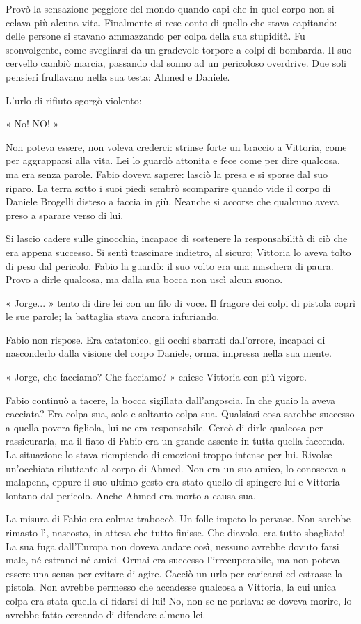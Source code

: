 Provò la sensazione peggiore del mondo quando capi che in quel corpo non si celava più alcuna vita. Finalmente si rese conto di quello che stava capitando: delle persone si stavano ammazzando per colpa della sua stupidità. Fu sconvolgente, come svegliarsi da un gradevole torpore a colpi di bombarda. Il suo cervello cambiò marcia, passando dal sonno ad un pericoloso overdrive. Due soli pensieri frullavano nella sua testa: Ahmed e Daniele.

L'urlo di rifiuto sgorgò violento:

« No! NO! »

Non poteva essere, non voleva crederci: strinse forte un braccio a Vittoria, come per aggrapparsi alla vita. Lei lo guardò attonita e fece come per dire qualcosa, ma era senza parole. Fabio doveva sapere: lasciò la presa e si sporse dal suo riparo. La terra sotto i suoi piedi sembrò scomparire quando vide il corpo di Daniele Brogelli disteso a faccia in giù. Neanche si accorse che qualcuno aveva preso a sparare verso di lui.

Si lascio cadere sulle ginocchia, incapace di sostenere la responsabilità di ciò che era appena successo. Si sentì trascinare indietro, al sicuro; Vittoria lo aveva tolto di peso dal pericolo. Fabio la guardò: il suo volto era una maschera di paura. Provo a dirle qualcosa, ma dalla sua bocca non uscì alcun suono.

« Jorge... » tento di dire lei con un filo di voce. Il fragore dei colpi di pistola coprì le sue parole; la battaglia stava ancora infuriando.

Fabio non rispose. Era catatonico, gli occhi sbarrati dall'orrore, incapaci di nasconderlo dalla visione del corpo Daniele, ormai impressa nella sua mente.

« Jorge, che facciamo? Che facciamo? » chiese Vittoria con più vigore.

Fabio continuò a tacere, la bocca sigillata dall'angoscia. In che guaio la aveva cacciata? Era colpa sua, solo e soltanto colpa sua. Qualsiasi cosa sarebbe successo a quella povera figliola, lui ne era responsabile. Cercò di dirle qualcosa per rassicurarla, ma il fiato di Fabio era un grande assente in tutta quella faccenda. La situazione lo stava riempiendo di emozioni troppo intense per lui. Rivolse un'occhiata riluttante al corpo di Ahmed. Non era un suo amico, lo conosceva a malapena, eppure il suo ultimo gesto era stato quello di spingere lui e Vittoria lontano dal pericolo. Anche Ahmed era morto a causa sua.

La misura di Fabio era colma: traboccò. Un folle impeto lo pervase. Non sarebbe rimasto lì, nascosto, in attesa che tutto finisse. Che diavolo, era tutto sbagliato! La sua fuga dall'Europa non doveva andare così, nessuno avrebbe dovuto farsi male, né estranei né amici. Ormai era successo l'irrecuperabile, ma non poteva essere una scusa per evitare di agire. Cacciò un urlo per caricarsi ed estrasse la pistola. Non avrebbe permesso che accadesse qualcosa a Vittoria, la cui unica colpa era stata quella di fidarsi di lui! No, non se ne parlava: se doveva morire, lo avrebbe fatto cercando di difendere almeno lei.

